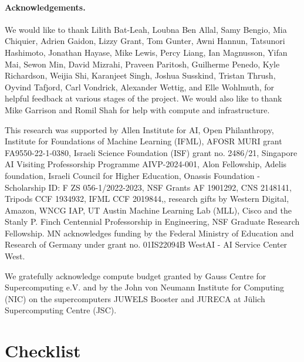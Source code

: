 \documentclass{article}
\newif\ifpreprint
\newcommand{\smallsec}[1]{\paragraph{#1}}
\begin{document}
\clearpage

\smallsec{Acknowledgements.} We would like to thank
Lilith Bat-Leah,
Loubna Ben Allal,
Samy Bengio,
Mia Chiquier,
Adrien Gaidon,
Lizzy Grant,
Tom Gunter,
Awni Hannun,
Tatsunori Hashimoto,
Jonathan Hayase,
Mike Lewis,
Percy Liang,
Ian Magnusson,
Yifan Mai,
Sewon Min,
David Mizrahi,
Praveen Paritosh,
Guilherme Penedo,
Kyle Richardson,
Weijia Shi,
Karanjeet Singh,
Joshua Susskind,
Tristan Thrush,
Oyvind Tafjord,
Carl Vondrick,
Alexander Wettig,
and
Elle Wohlmuth,
for helpful feedback at various stages of the project.
We would also like to thank Mike Garrison and Romil Shah for help with compute and infrastructure.

This research was supported by
Allen Institute for AI,
Open Philanthropy,
Institute for Foundations of Machine Learning (IFML),
AFOSR MURI grant FA9550-22-1-0380,
Israeli Science Foundation (ISF) grant no. 2486/21,
Singapore AI Visiting Professorship Programme AIVP-2024-001,
Alon Fellowship,
Adelis foundation,
Israeli Council for Higher Education,
Onassis Foundation - Scholarship ID: F ZS 056-1/2022-2023,
NSF Grants AF 1901292,
CNS 2148141,
Tripods CCF 1934932,
IFML CCF 2019844,,
research gifts by Western Digital, Amazon, WNCG IAP, UT Austin Machine Learning Lab (MLL), Cisco and the Stanly P. Finch Centennial Professorship in Engineering,
NSF Graduate Research Fellowship.
MN acknowledges funding by the Federal Ministry of Education and Research of Germany under grant no. 01IS22094B WestAI - AI Service Center West.

We gratefully acknowledge compute budget granted by Gauss Centre for Supercomputing e.V. and by the John von Neumann Institute for Computing (NIC) on the supercomputers JUWELS Booster and JURECA at Jülich Supercomputing Centre (JSC).




\clearpage

%
%
%

%
\clearpage
\ifpreprint
\else
\section*{Checklist}

%
%
%
%
%
%
%
%
%
%
%
%
%
%
%
%
%
%
\end{document}
